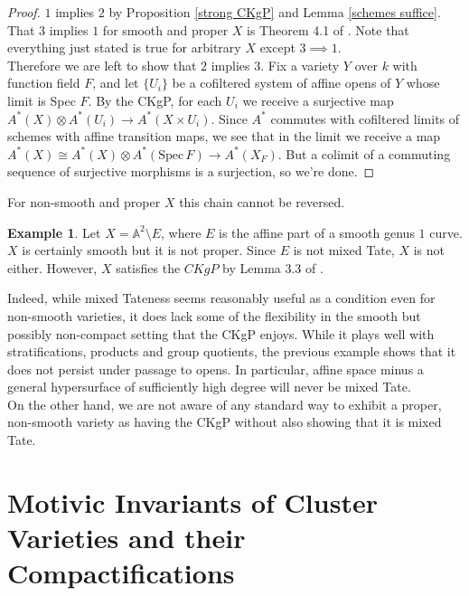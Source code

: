 \documentclass[11pt]{amsart}
\theoremstyle{definition}
\newtheorem{exmp}[thm]{Example}
\theoremstyle{remark}
\newcommand{\Spec}{\text{Spec}\,}
\numberwithin{equation}{section}
\begin{document}
\begin{proof}
    $1$ implies $2$ by Proposition \ref{strong CKgP} and Lemma \ref{schemes suffice}. That $3$ implies $1$ for smooth and proper $X$ is Theorem 4.1 of \cite{totaro2016motive}. Note that everything just stated is true for arbitrary $X$ except $3 \implies 1$.\\

    Therefore we are left to show that $2$ implies $3$. Fix a variety $Y$ over $k$ with function field $F$, and let $\{U_i\}$ be a cofiltered system of affine opens of $Y$ whose limit is Spec $F$. By the CKgP, for each $U_i$ we receive a surjective map $A^*(X) \otimes A^*(U_i) \rightarrow A^*(X \times U_i)$. Since $A^*$ commutes with cofiltered limits of schemes with affine transition maps, we see that in the limit we receive a map $A^*(X) \cong A^*(X) \otimes A^*(\Spec F) \rightarrow A^*(X_F)$. But a colimit of a commuting sequence of surjective morphisms is a surjection, so we're done.
\end{proof}



For non-smooth and proper $X$ this chain cannot be reversed.

\begin{exmp}
    Let $X = \mathbb{A}^2 \setminus E$, where $E$ is the affine part of a smooth genus $1$ curve. $X$ is certainly smooth but it is not proper. Since $E$ is not mixed Tate, $X$ is not either. However, $X$ satisfies the $CKgP$ by Lemma 3.3 of \cite{MR5083265}.
\end{exmp}

Indeed, while mixed Tateness seems reasonably useful as a condition even for non-smooth varieties, it does lack some of the flexibility in the smooth but possibly non-compact setting that the CKgP enjoys. While it plays well with stratifications, products and group quotients, the previous example shows that it does not persist under passage to opens. In particular, affine space minus a general hypersurface of sufficiently high degree will never be mixed Tate.\\

On the other hand, we are not aware of any standard way to exhibit a proper, non-smooth variety as having the CKgP without also showing that it is mixed Tate.

\section{Motivic Invariants of Cluster Varieties and their Compactifications}\label{section 4}
\end{document}
